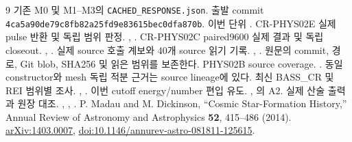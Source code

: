 \documentclass[11pt,a4paper]{article}
\begin{document}
\begin{thebibliography}{9}
\small
{} 기존 M0 및 M1--M3의 \texttt{CACHED\_RESPONSE.json}.
출발 commit \texttt{4ca5a90de79c8fb82a25fd9e83615bec0dfa870b}.
이번 단위 .
 CR-PHYS02E 실제 pulse 반환 및 독립 범위 판정.
, .
 CR-PHYS02C paired9600 실제 결과 및 독립 closeout.
, .
 실제 source 호출 계보와 40개 source 읽기 기록.
,
.
원문의 commit, 경로, Git blob, SHA256 및 읽은 범위를 보존한다.
 PHYS02B source coverage.
.
동일 constructor와 mesh 독립 적분 근거는 source lineage에 있다.
 최신 BASS\_CR 및 REI 범위별 조사.
,
.
 이번 cutoff energy/number 편입 유도.
, 의 A2.
 실제 산술 출력과 원장 대조.
,
,
.
 P. Madau and M. Dickinson, “Cosmic Star-Formation History,”
Annual Review of Astronomy and Astrophysics \textbf{52}, 415--486 (2014).
\href{https://arxiv.org/abs/1403.0007}{arXiv:1403.0007},
\href{https://doi.org/10.1146/annurev-astro-081811-125615}{doi:10.1146/annurev-astro-081811-125615}.
\end{thebibliography}
\end{document}
